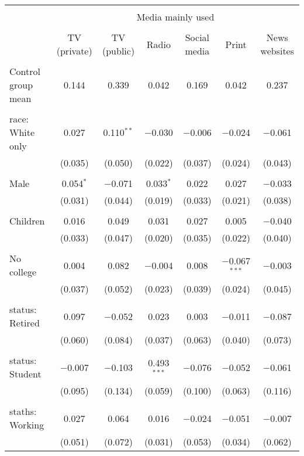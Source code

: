 
\begin{tabular}{@{\extracolsep{5pt}}lcccccc} 
\\[-1.8ex]\hline 
\hline \\[-1.8ex] 
 & \multicolumn{6}{c}{Media mainly used} \\ 
\cline{2-7} 
\\[-1.8ex] & TV (private) & TV (public) & Radio & Social media & Print & News websites \\ 
\hline \\[-1.8ex] 
 Control group mean & 0.144 & 0.339 & 0.042 & 0.169 & 0.042 & 0.237  \\ \hline \\[-1.8ex] race: White only & 0.027 & 0.110$^{**}$ & $-$0.030 & $-$0.006 & $-$0.024 & $-$0.061 \\ 
  & (0.035) & (0.050) & (0.022) & (0.037) & (0.024) & (0.043) \\ 
  & & & & & & \\ 
 Male & 0.054$^{*}$ & $-$0.071 & 0.033$^{*}$ & 0.022 & 0.027 & $-$0.033 \\ 
  & (0.031) & (0.044) & (0.019) & (0.033) & (0.021) & (0.038) \\ 
  & & & & & & \\ 
 Children & 0.016 & 0.049 & 0.031 & 0.027 & 0.005 & $-$0.040 \\ 
  & (0.033) & (0.047) & (0.020) & (0.035) & (0.022) & (0.040) \\ 
  & & & & & & \\ 
 No college & 0.004 & 0.082 & $-$0.004 & 0.008 & $-$0.067$^{***}$ & $-$0.003 \\ 
  & (0.037) & (0.052) & (0.023) & (0.039) & (0.024) & (0.045) \\ 
  & & & & & & \\ 
 status: Retired & 0.097 & $-$0.052 & 0.023 & 0.003 & $-$0.011 & $-$0.087 \\ 
  & (0.060) & (0.084) & (0.037) & (0.063) & (0.040) & (0.073) \\ 
  & & & & & & \\ 
 status: Student & $-$0.007 & $-$0.103 & 0.493$^{***}$ & $-$0.076 & $-$0.052 & $-$0.061 \\ 
  & (0.095) & (0.134) & (0.059) & (0.100) & (0.063) & (0.116) \\ 
  & & & & & & \\ 
 staths: Working & 0.027 & 0.064 & 0.016 & $-$0.024 & $-$0.051 & $-$0.007 \\ 
  & (0.051) & (0.072) & (0.031) & (0.053) & (0.034) & (0.062) \\ 

\end{tabular}
